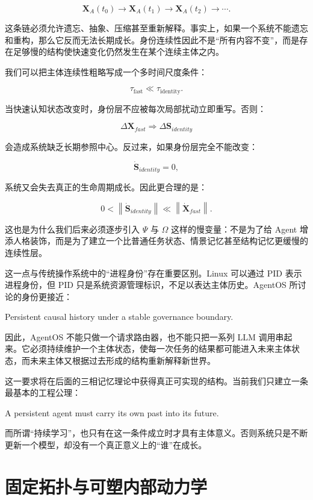\[
\mathbf{X}_A(t_0)
\rightarrow
\mathbf{X}_A(t_1)
\rightarrow
\mathbf{X}_A(t_2)
\rightarrow
\cdots.
\]

这条链必须允许遗忘、抽象、压缩甚至重新解释。事实上，如果一个系统不能遗忘和重构，那么它反而无法长期成长。身份连续性因此不是“所有内容不变”，而是存在足够慢的结构使快速变化仍然发生在某个连续主体之内。

我们可以把主体连续性粗略写成一个多时间尺度条件：

\[
\tau_{\text{fast}}
\ll
\tau_{\text{identity}}.
\]

当快速认知状态改变时，身份层不应被每次局部扰动立即重写。否则：

\[
\Delta \mathbf{X}_{fast}
\Rightarrow
\Delta\mathbf{S}_{identity}
\]

会造成系统缺乏长期参照中心。反过来，如果身份层完全不能改变：

\[
\dot{\mathbf{S}}_{identity}=0,
\]

系统又会失去真正的生命周期成长。因此更合理的是：

\[
0<
\left\|
\dot{\mathbf{S}}_{identity}
\right\|
\ll
\left\|
\dot{\mathbf{X}}_{fast}
\right\|.
\]

这也是为什么我们后来必须逐步引入 $\Psi$ 与 $\Omega$ 这样的慢变量：不是为了给 Agent 增添人格装饰，而是为了建立一个比普通任务状态、情景记忆甚至结构记忆更缓慢的连续性层。

这一点与传统操作系统中的“进程身份”存在重要区别。Linux 可以通过 PID 表示进程身份，但 PID 只是系统资源管理标识，不足以表达主体历史。AgentOS 所讨论的身份更接近：

\begin{statementbox}
Persistent causal history under a stable governance boundary.
\end{statementbox}

因此，AgentOS 不能只做一个请求路由器，也不能只把一系列 LLM 调用串起来。它必须持续维护一个主体状态，使每一次任务的结果都可能进入未来主体状态，而未来主体又根据过去形成的结构重新解释新世界。

这一要求将在后面的三相记忆理论中获得真正可实现的结构。当前我们只建立一条最基本的工程公理：

\begin{statementbox}
A persistent agent must carry its own past into its future.
\end{statementbox}

而所谓“持续学习”，也只有在这一条件成立时才具有主体意义。否则系统只是不断更新一个模型，却没有一个真正意义上的“谁”在成长。

\section{固定拓扑与可塑内部动力学}

